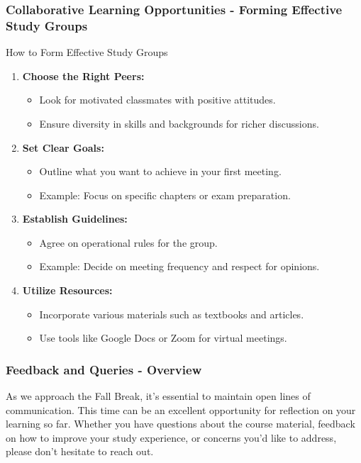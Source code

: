 \documentclass[aspectratio=169]{beamer}
\begin{document}
\begin{frame}[fragile]
    \frametitle{Collaborative Learning Opportunities - Forming Effective Study Groups}
    \begin{block}{How to Form Effective Study Groups}
        \begin{enumerate}
            \item \textbf{Choose the Right Peers:}
                \begin{itemize}
                    \item Look for motivated classmates with positive attitudes.
                    \item Ensure diversity in skills and backgrounds for richer discussions.
                \end{itemize}
            
            \item \textbf{Set Clear Goals:}
                \begin{itemize}
                    \item Outline what you want to achieve in your first meeting.
                    \item Example: Focus on specific chapters or exam preparation.
                \end{itemize}
                
            \item \textbf{Establish Guidelines:}
                \begin{itemize}
                    \item Agree on operational rules for the group.
                    \item Example: Decide on meeting frequency and respect for opinions.
                \end{itemize}
                
            \item \textbf{Utilize Resources:}
                \begin{itemize}
                    \item Incorporate various materials such as textbooks and articles.
                    \item Use tools like Google Docs or Zoom for virtual meetings.
                \end{itemize}
        \end{enumerate}
    \end{block}
\end{frame}

\begin{frame}[fragile]
    \frametitle{Feedback and Queries - Overview}
    As we approach the Fall Break, it's essential to maintain open lines of communication.  
    This time can be an excellent opportunity for reflection on your learning so far.  
    Whether you have questions about the course material, feedback on how to improve your study experience, or concerns you'd like to address, please don't hesitate to reach out.
\end{frame}
\end{document}
